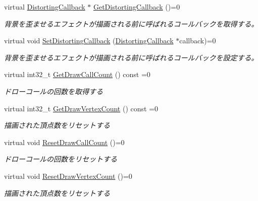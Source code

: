 \begin{DoxyCompactItemize}
virtual \mbox{\hyperlink{class_effekseer_renderer_1_1_distorting_callback}{Distorting\+Callback}} $\ast$ \mbox{\hyperlink{class_effekseer_renderer_1_1_renderer_af4db92a0262062bfcc8f3f2334e5a168}{Get\+Distorting\+Callback}} ()=0
\begin{DoxyCompactList}\small\item\em 背景を歪ませるエフェクトが描画される前に呼ばれるコールバックを取得する。 \end{DoxyCompactList}\item 
virtual void \mbox{\hyperlink{class_effekseer_renderer_1_1_renderer_a8806b5a83c5ea73e09662f4a0869f8f0}{Set\+Distorting\+Callback}} (\mbox{\hyperlink{class_effekseer_renderer_1_1_distorting_callback}{Distorting\+Callback}} $\ast$callback)=0
\begin{DoxyCompactList}\small\item\em 背景を歪ませるエフェクトが描画される前に呼ばれるコールバックを設定する。 \end{DoxyCompactList}\item 
virtual int32\+\_\+t \mbox{\hyperlink{class_effekseer_renderer_1_1_renderer_a1169dda7afa6933c049bd5f914c2fecb}{Get\+Draw\+Call\+Count}} () const =0
\begin{DoxyCompactList}\small\item\em ドローコールの回数を取得する \end{DoxyCompactList}\item 
virtual int32\+\_\+t \mbox{\hyperlink{class_effekseer_renderer_1_1_renderer_af24ee0238724b207461d96add686e878}{Get\+Draw\+Vertex\+Count}} () const =0
\begin{DoxyCompactList}\small\item\em 描画された頂点数をリセットする \end{DoxyCompactList}\item 
virtual void \mbox{\hyperlink{class_effekseer_renderer_1_1_renderer_aef72f720dba854b9e28a7bae618564ed}{Reset\+Draw\+Call\+Count}} ()=0
\begin{DoxyCompactList}\small\item\em ドローコールの回数をリセットする \end{DoxyCompactList}\item 
virtual void \mbox{\hyperlink{class_effekseer_renderer_1_1_renderer_a0aa2190291ec83c8b45b0dbd30b48a3a}{Reset\+Draw\+Vertex\+Count}} ()=0
\begin{DoxyCompactList}\small\item\em 描画された頂点数をリセットする \end{DoxyCompactList}\item 

\end{DoxyCompactItemize}
